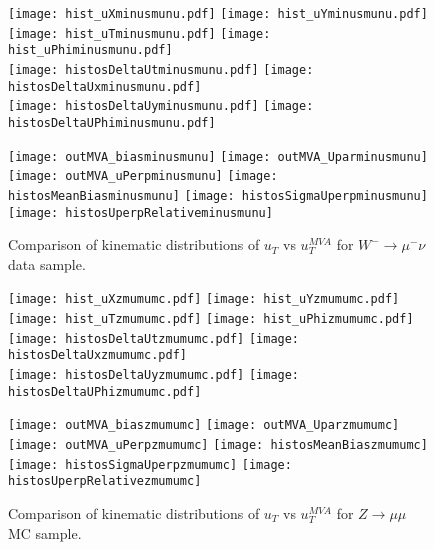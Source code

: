     \begin{figure}[h]
    	\centering
    	{\texttt{[image: hist\_uXminusmunu.pdf]}}
    	{\texttt{[image: hist\_uYminusmunu.pdf]}} \\
    	{\texttt{[image: hist\_uTminusmunu.pdf]}}
    	{\texttt{[image: hist\_uPhiminusmunu.pdf]}}\\
    	{\texttt{[image: histosDeltaUtminusmunu.pdf]}}
    	{\texttt{[image: histosDeltaUxminusmunu.pdf]}} \\
    	{\texttt{[image: histosDeltaUyminusmunu.pdf]}}
    	{\texttt{[image: histosDeltaUPhiminusmunu.pdf]}}\\
    	\label{fig:minusmunu_data_distributions1}
    \end{figure}
    \begin{figure}[h]
    	\centering
    	{\texttt{[image: outMVA\_biasminusmunu]}}
    	{\texttt{[image: outMVA\_Uparminusmunu]}}
    	{\texttt{[image: outMVA\_uPerpminusmunu]}}
    	{\texttt{[image: histosMeanBiasminusmunu]}}
    	{\texttt{[image: histosSigmaUperpminusmunu]}}
    	{\texttt{[image: histosUperpRelativeminusmunu]}}
    	\caption{Comparison of kinematic distributions of $u_T$ vs $u_T^{MVA}$ for $W^-\rightarrow \mu^-\nu$ data sample.}
    	\label{fig:minusmunu_data_distributions2}
    \end{figure}
    
        
    \begin{figure}[h]
    	\centering
    	{\texttt{[image: hist\_uXzmumumc.pdf]}}
    	{\texttt{[image: hist\_uYzmumumc.pdf]}} \\
    	{\texttt{[image: hist\_uTzmumumc.pdf]}}
    	{\texttt{[image: hist\_uPhizmumumc.pdf]}}\\
    	{\texttt{[image: histosDeltaUtzmumumc.pdf]}}
    	{\texttt{[image: histosDeltaUxzmumumc.pdf]}} \\
    	{\texttt{[image: histosDeltaUyzmumumc.pdf]}}
    	{\texttt{[image: histosDeltaUPhizmumumc.pdf]}}\\
    	\label{fig:zmumu_mc_distributions1}
    \end{figure}
    \begin{figure}[h]
    	\centering
    	{\texttt{[image: outMVA\_biaszmumumc]}}
    	{\texttt{[image: outMVA\_Uparzmumumc]}}
    	{\texttt{[image: outMVA\_uPerpzmumumc]}}
    	{\texttt{[image: histosMeanBiaszmumumc]}}
    	{\texttt{[image: histosSigmaUperpzmumumc]}}
    	{\texttt{[image: histosUperpRelativezmumumc]}}
    	\caption{Comparison of kinematic distributions of $u_T$ vs $u_T^{MVA}$ for $Z\rightarrow \mu\mu$ MC sample.}
    	\label{fig:zmumu_mc_distributions2}
    \end{figure}
    
